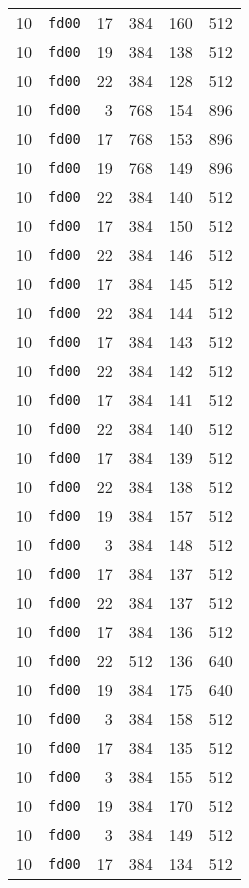 \documentclass{article}
\begin{document}
\begin{table}[h!]
\begin{tabular}{llrrrl}
    10 & \texttt{fd00} & 17 & 384 & 160 & 512 \\
    10 & \texttt{fd00} & 19 & 384 & 138 & 512 \\
    10 & \texttt{fd00} & 22 & 384 & 128 & 512 \\
    10 & \texttt{fd00} & 3 & 768 & 154 & 896 \\
    10 & \texttt{fd00} & 17 & 768 & 153 & 896 \\
    10 & \texttt{fd00} & 19 & 768 & 149 & 896 \\
    10 & \texttt{fd00} & 22 & 384 & 140 & 512 \\
    10 & \texttt{fd00} & 17 & 384 & 150 & 512 \\
    10 & \texttt{fd00} & 22 & 384 & 146 & 512 \\
    10 & \texttt{fd00} & 17 & 384 & 145 & 512 \\
    10 & \texttt{fd00} & 22 & 384 & 144 & 512 \\
    10 & \texttt{fd00} & 17 & 384 & 143 & 512 \\
    10 & \texttt{fd00} & 22 & 384 & 142 & 512 \\
    10 & \texttt{fd00} & 17 & 384 & 141 & 512 \\
    10 & \texttt{fd00} & 22 & 384 & 140 & 512 \\
    10 & \texttt{fd00} & 17 & 384 & 139 & 512 \\
    10 & \texttt{fd00} & 22 & 384 & 138 & 512 \\
    10 & \texttt{fd00} & 19 & 384 & 157 & 512 \\
    10 & \texttt{fd00} & 3 & 384 & 148 & 512 \\
    10 & \texttt{fd00} & 17 & 384 & 137 & 512 \\
    10 & \texttt{fd00} & 22 & 384 & 137 & 512 \\
    10 & \texttt{fd00} & 17 & 384 & 136 & 512 \\
    10 & \texttt{fd00} & 22 & 512 & 136 & 640 \\
    10 & \texttt{fd00} & 19 & 384 & 175 & 640 \\
    10 & \texttt{fd00} & 3 & 384 & 158 & 512 \\
    10 & \texttt{fd00} & 17 & 384 & 135 & 512 \\
    10 & \texttt{fd00} & 3 & 384 & 155 & 512 \\
    10 & \texttt{fd00} & 19 & 384 & 170 & 512 \\
    10 & \texttt{fd00} & 3 & 384 & 149 & 512 \\
    10 & \texttt{fd00} & 17 & 384 & 134 & 512 \\

\end{tabular}
\end{table}
\end{document}
